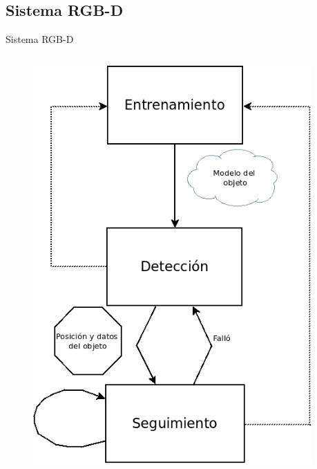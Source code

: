 \documentclass[]{beamer}
\begin{document}
\subsection{Sistema RGB-D}
\begin{frame}{Sistema RGB-D}
    \begin{columns}
        \begin{column}{5cm}
            \begin{figure}
                \centering
                \vspace{-15pt}
                \includegraphics[scale=0.3]{img/esquema_seguimiento.png}
            \end{figure}
        \end{column}

        \begin{column}{0.5cm}
        \end{column}


\end{columns}
\end{frame}
\end{document}
